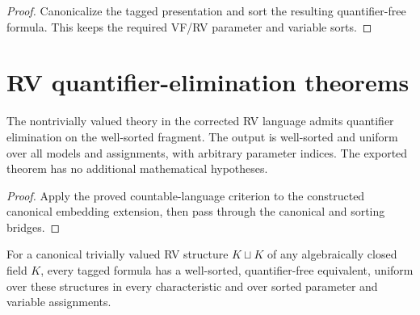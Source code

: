 \begin{proof}


\leanok

Canonicalize the tagged presentation and sort the resulting quantifier-free
formula. This keeps the required VF/RV parameter and variable sorts.

\end{proof}

\section{RV quantifier-elimination theorems}

\begin{theorem}

\label{rv}


\leanok

The nontrivially valued theory in the corrected RV language admits
quantifier elimination on the well-sorted fragment. The output is well-sorted
and uniform over all models and assignments, with arbitrary parameter
indices. The exported theorem has no additional mathematical hypotheses.

\end{theorem}

\begin{proof}


\leanok

Apply the proved countable-language criterion to the constructed canonical
embedding extension, then pass through the canonical and sorting bridges.

\end{proof}

\begin{theorem}

\label{rv-trivial}


\leanok

For a canonical trivially valued RV structure $K\sqcup K$ of any
algebraically closed field $K$, every tagged formula has a well-sorted,
quantifier-free equivalent, uniform over these structures in every
characteristic and over sorted parameter and variable assignments.

\end{theorem}

